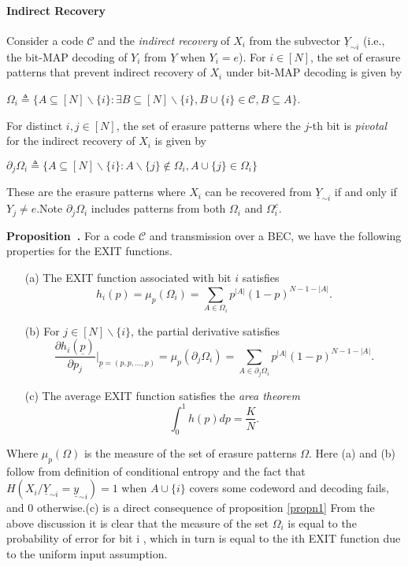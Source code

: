 \documentclass[
10pt, %
a4paper, %
oneside, %
headinclude,footinclude, %
BCOR5mm, %
]{scrartcl}
\newenvironment{proposition}[1][]{\refstepcounter{definition}\par\medskip
   \noindent \textbf{Proposition~\thedefinition. #1} \rmfamily}{\medskip}
\begin{document}
\paragraph{Indirect Recovery} Consider a code $\mathcal{C}$ and the \emph{indirect recovery} of $X_i$ from the subvector $\underline{Y}_{\sim i}$ (i.e., the bit-MAP decoding of $Y_i$ from $\underline{Y}$ when $Y_i=e$). For $i \in [N]$, the set of erasure patterns that prevent indirect recovery of $X_i$ under bit-MAP decoding is given by 
\begin{definition}
$\Omega_i \triangleq \{A \subseteq [N]\backslash\{i\} : \exists B \subseteq [N]\backslash\{i\}, B \cup \{i\} \in \mathcal{C}, B \subseteq A\}$.
\label{defn2}
\end{definition}
For distinct $i,j \in [N]$, the set of erasure patterns where the $j$-th bit is \emph{pivotal} for the indirect recovery of $X_i$ is given by 
\begin{definition}
$\partial_j\Omega_i \triangleq \{A \subseteq [N]\backslash\{i\}: A\backslash \{j\} \notin \Omega_i, A \cup \{j\} \in \Omega_i \}$
\end{definition}
These are the erasure patterns where $X_i$ can be recovered from $\underline{Y}_{\sim i}$ if and only if $Y_j \neq e$.Note $\partial_j\Omega_i$ includes patterns from both $\Omega_i$ and $\Omega_i^c$.
\begin{proposition}
\label{propn4}
For a code $\mathcal{C}$ and transmission over a BEC, we have the following properties for the EXIT functions.
\begin{enumerate}
\item[(a)] The EXIT function associated with bit $i$ satisfies $$h_i(p) = \mu_{p}(\Omega_i)= \sum_{A \in \Omega_i} p^{|A|}(1-p)^{N-1-|A|}.$$
\item[(b)] For $j \in [N]\backslash\{i\}$, the partial derivative satisfies $$\frac{\partial h_i(\underline{p})}{\partial p_j}\Bigg|_{\underline{p}=(p,p,\ldots,p)} =\mu_{p}(\partial_j\Omega_i)= \sum_{A \in \partial_j\Omega_i} p^{|A|}(1-p)^{N-1-|A|}.$$
\item[(c)]The average EXIT function satisfies the \emph{area theorem} $$\int_0^1 h(p)dp = \frac{K}{N}.$$
\end{enumerate}
Where $\mu_{p}(\Omega)$ is the measure of the set of erasure patterns $\Omega$.
Here (a) and (b) follow from definition of conditional entropy and the fact that $H(X_i/\underline{Y}_{\sim i}=\underline{y}_{\sim i})=1$ when $A \cup \{i\}$ covers some codeword and decoding fails, and $0$ otherwise.(c) is a direct consequence of proposition \ref{propn1}
\end{proposition}
From the above discussion it is clear that the measure of the set $\Omega_i$ is equal to the probability of error for bit i , which in turn is equal to the ith EXIT function due to the uniform input assumption.
\end{document}
